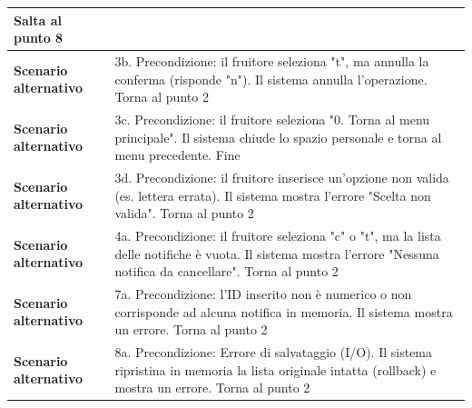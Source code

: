 \documentclass[12pt, a4paper, oneside]{report}
\begin{document}
\begin{tabularx}{\textwidth}{|l|X|}
    Salta al punto 8 \\ \hline
    \textbf{Scenario alternativo} & 
    3b. Precondizione: il fruitore seleziona "t", ma annulla la conferma (risponde "n").\newline
    Il sistema annulla l'operazione.\newline
    Torna al punto 2 \\ \hline
    \textbf{Scenario alternativo} & 
    3c. Precondizione: il fruitore seleziona "0. Torna al menu principale".\newline
    Il sistema chiude lo spazio personale e torna al menu precedente.\newline
    Fine \\ \hline
    \textbf{Scenario alternativo} & 
    3d. Precondizione: il fruitore inserisce un'opzione non valida (es. lettera errata).\newline
    Il sistema mostra l'errore "Scelta non valida".\newline
    Torna al punto 2 \\ \hline
    \textbf{Scenario alternativo} & 
    4a. Precondizione: il fruitore seleziona "c" o "t", ma la lista delle notifiche è vuota.\newline
    Il sistema mostra l'errore "Nessuna notifica da cancellare".\newline
    Torna al punto 2 \\ \hline
    \textbf{Scenario alternativo} & 
    7a. Precondizione: l'ID inserito non è numerico o non corrisponde ad alcuna notifica in memoria.\newline
    Il sistema mostra un errore.\newline
    Torna al punto 2 \\ \hline
    \textbf{Scenario alternativo} & 
    8a. Precondizione: Errore di salvataggio (I/O).\newline
    Il sistema ripristina in memoria la lista originale intatta (rollback) e mostra un errore.\newline
    Torna al punto 2 \\ \hline
\end{tabularx}

\renewcommand{\arraystretch}{1.4} 
\end{document}
